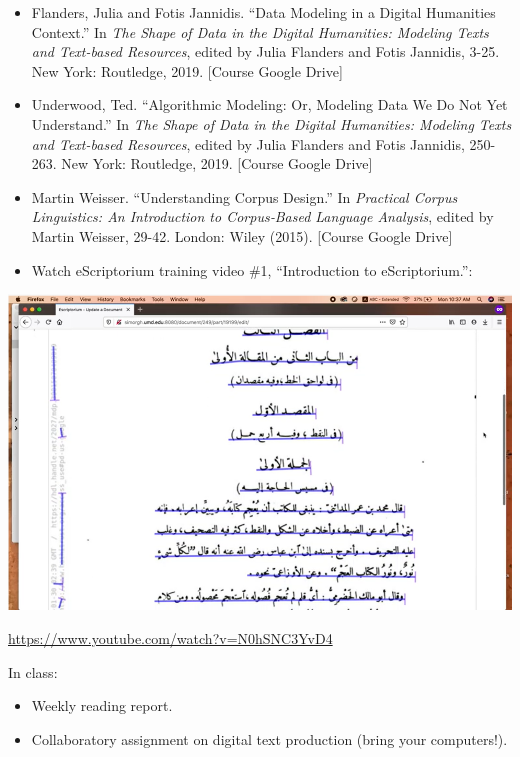 \documentclass[
]{book}
\providecommand{\tightlist}{%
  \setlength{\itemsep}{0pt}\setlength{\parskip}{0pt}}
\begin{document}
\begin{itemize}
\tightlist
\item
  Flanders, Julia and Fotis Jannidis. ``Data Modeling in a Digital Humanities Context.'' In \emph{The Shape of Data in the Digital Humanities: Modeling Texts and Text-based Resources}, edited by Julia Flanders and Fotis Jannidis, 3-25. New York: Routledge, 2019. {[}Course Google Drive{]}\\
\item
  Underwood, Ted. ``Algorithmic Modeling: Or, Modeling Data We Do Not Yet Understand.'' In \emph{The Shape of Data in the Digital Humanities: Modeling Texts and Text-based Resources}, edited by Julia Flanders and Fotis Jannidis, 250-263. New York: Routledge, 2019. {[}Course Google Drive{]}
\item
  Martin Weisser. ``Understanding Corpus Design.'' In \emph{Practical Corpus Linguistics: An Introduction to Corpus‐Based Language Analysis}, edited by Martin Weisser, 29-42. London: Wiley (2015). {[}Course Google Drive{]}
\item
  Watch eScriptorium training video \#1, ``Introduction to eScriptorium.'':
\end{itemize}

\href{https://www.youtube.com/watch?v=N0hSNC3YvD4}{\includegraphics{img/eScriptorium_video1_screenshot.png}}

\url{https://www.youtube.com/watch?v=N0hSNC3YvD4}

In class:

\begin{itemize}
\tightlist
\item
  Weekly reading report.
\item
  Collaboratory assignment on digital text production (bring your computers!).
\end{itemize}
\end{document}
